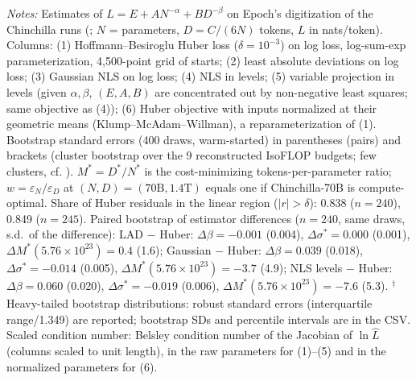 \begin{table}[!htbp]
\begin{threeparttable}
\begin{tablenotes}[flushleft]
\item \textit{Notes:} Estimates of $L=E+AN^{-\alpha}+BD^{-\beta}$ on Epoch's digitization of the Chinchilla runs (\citealt{besiroglu2024chinchilla}; $N$ = parameters, $D=C/(6N)$ tokens, $L$ in nats/token). Columns: (1) Hoffmann--Besiroglu Huber loss ($\delta=10^{-3}$) on log loss, log-sum-exp parameterization, 4,500-point grid of starts; (2) least absolute deviations on log loss; (3) Gaussian NLS on log loss; (4) NLS in levels; (5) variable projection in levels (given $\alpha,\beta$, $(E,A,B)$ are concentrated out by non-negative least squares; same objective as (4)); (6) Huber objective with inputs normalized at their geometric means (Klump--McAdam--Willman), a reparameterization of (1). Bootstrap standard errors (400 draws, warm-started) in parentheses (pairs) and brackets (cluster bootstrap over the 9 reconstructed IsoFLOP budgets; few clusters, cf. \citealt{cameron2008bootstrap}). $M^*=D^*/N^*$ is the cost-minimizing tokens-per-parameter ratio; $w=\varepsilon_N/\varepsilon_D$ at $(N,D)=(70\text{B},1.4\text{T})$ equals one if Chinchilla-70B is compute-optimal. Share of Huber residuals in the linear region ($|r|>\delta$): 0.838 ($n=240$), 0.849 ($n=245$). Paired bootstrap of estimator differences ($n=240$, same draws, s.d.\ of the difference): LAD $-$ Huber: $\Delta\beta=-0.001$ (0.004), $\Delta\sigma^*=0.000$ (0.001), $\Delta M^*(5.76\times10^{23})=0.4$ (1.6); Gaussian $-$ Huber: $\Delta\beta=0.039$ (0.018), $\Delta\sigma^*=-0.014$ (0.005), $\Delta M^*(5.76\times10^{23})=-3.7$ (4.9); NLS levels $-$ Huber: $\Delta\beta=0.060$ (0.020), $\Delta\sigma^*=-0.019$ (0.006), $\Delta M^*(5.76\times10^{23})=-7.6$ (5.3). $^\dagger$Heavy-tailed bootstrap distributions: robust standard errors (interquartile range/1.349) are reported; bootstrap SDs and percentile intervals are in the CSV. Scaled condition number: Belsley condition number of the Jacobian of $\ln\hat L$ (columns scaled to unit length), in the raw parameters for (1)--(5) and in the normalized parameters for (6).
\end{tablenotes}
\end{threeparttable}
\end{table}
